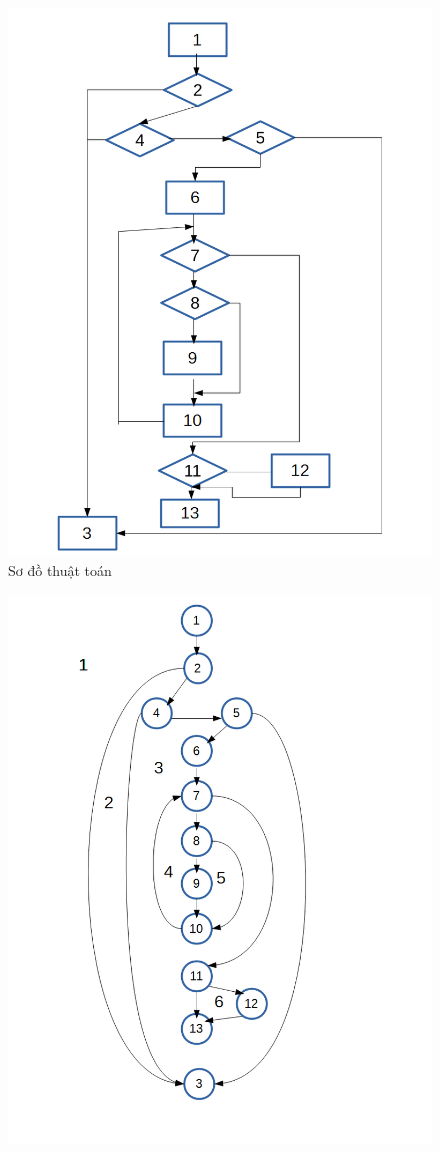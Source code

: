 \documentclass[a4paper,12pt]{report}
\begin{document}
\begin{figure}[!]
		\includegraphics[scale=0.4]{KTHopTrangSoDo.png}
		\caption{Sơ đồ thuật toán}
\end{figure}\begin{figure}[!]
		\centering
		\includegraphics[scale=0.4]{KTHopTrangDoThi.png}

\end{figure}
\end{document}
